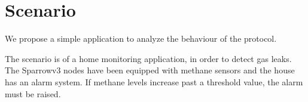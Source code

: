 
\chapter{Scenario}

We propose a simple application to analyze the behaviour of the protocol. 

The scenario is of a home monitoring application, in order to detect gas leaks.
The Sparrowv3 nodes have been equipped with methane sensors and the house has
an alarm system. If methane levels increase past a threshold value, the alarm
must be raised.

